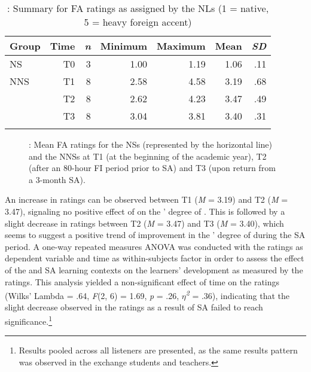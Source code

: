 \documentclass[output=paper]{langsci/langscibook}
\begin{document}
\begin{table}
\begin{tabularx}{\textwidth}{Xrrrrrr}
\lsptoprule
 Group &  Time &  \textit{n} &  Minimum &  Maximum &  Mean &  \textit{SD}\\
 \midrule
NS & T0 & 3 & 1.00 & 1.19 & 1.06 & .11\\
NNS & T1 & 8 & 2.58 & 4.58 & 3.19 & .68\\
~ & T2 & 8 & 2.62 & 4.23 & 3.47 & .49\\
~ & T3 & 8 & 3.04 & 3.81 & 3.40 & .31\\
\lspbottomrule
\end{tabularx}
\caption{\label{tab:avello:1}: Summary for FA ratings as assigned by the NLs (1 = native, 5 = heavy foreign accent)}
\end{table}


\begin{figure}
 
 
\caption{\label{fig:avello:2}: Mean FA ratings for the NSs (represented by the horizontal line) and the NNSs at T1 (at the beginning of the academic year), T2 (after an 80-hour FI period prior to SA) and T3 (upon return from a 3-month SA).}
\end{figure}


An increase in  ratings can be observed between T1 (\textit{M} = 3.19) and T2 (\textit{M} = 3.47), signaling no positive effect of  on the ’ degree of . This is followed by a slight decrease in  ratings between T2 (\textit{M} = 3.47) and T3 (\textit{M} = 3.40), which seems to suggest a positive trend of improvement in the ’ degree of  during the SA period. A one-way repeated measures ANOVA was conducted with the  ratings as dependent variable and time as within-subjects factor in order to assess the effect of the  and SA learning contexts on the  learners’  development as measured by the  ratings. This analysis yielded a non-significant effect of time on the  ratings (Wilks’ Lambda = .64, \textit{F}(2, 6) = 1.69, \textit{p} = .26, \textit{$\eta $\textsuperscript{2} }= .36), indicating that the slight decrease observed in the  ratings as a result of SA failed to reach significance.\footnote{Results pooled across all listeners are presented, as the same results pattern was observed in the exchange students and  teachers.}
\end{document}
